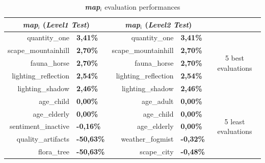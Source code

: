		\begin{table}
	\centering	
	\caption{\textbf{\textit{map$_{i}$}} evaluation performances}
		\label{table_resume2}
		\begin{tabular}{rl rl c} 
			\hline
			
			\multicolumn{2}{c}{\textbf{\textit{map$_{i}$}} (\emph{Level1 Test})} & 
			\multicolumn{2}{c}{\textbf{\textit{map$_{i}$}} (\emph{Level2 Test})} & \\
			\hline  

			quantity\_one&\textbf{3,41\%}&quantity\_one&\textbf{3,41\%}& \multirow{5}{*}{5 best evaluations}\\
			scape\_mountainhill&\textbf{2,70\%}&scape\_mountainhill&\textbf{2,70\%}& \\
			fauna\_horse&\textbf{2,70\%}&fauna\_horse&\textbf{2,70\%}& \\
			lighting\_reflection&\textbf{2,54\%}&lighting\_reflection&\textbf{2,54\%}& \\
			lighting\_shadow&\textbf{2,46\%}&lighting\_shadow&\textbf{2,46\%}& \\
			\hline
			age\_child&\textbf{0,00\%}&age\_adult&\textbf{0,00\%}& \multirow{5}{*}{5 least evaluations}\\
			age\_elderly&\textbf{0,00\%}&age\_child&\textbf{0,00\%}& \\
			sentiment\_inactive&\textbf{-0,16\%}&age\_elderly&\textbf{0,00\%}& \\
			quality\_artifacts&\textbf{-50,63\%}&weather\_fogmist&\textbf{-0,32\%}& \\
			flora\_tree&\textbf{-50,63\%}&scape\_city&\textbf{-0,48\%}& \\
			\hline 
\end{tabular}
\end{table}


